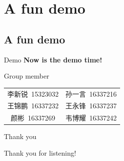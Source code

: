 \documentclass{beamer}
\begin{document}
\section{A fun demo}
\subsection{A fun demo}
\begin{frame}{Demo}
  \centering
  \Huge \textbf{\textcolor[rgb]{0,0,1}{Now is the demo time!}}
\end{frame}

\begin{frame}{Group member}
 \large
  \begin{center}
    \begin{tabular}{cc}%
    李新锐\ 15323032&孙一言\ 16337216\\
    王锦鹏\ 16337232&王永锋\ 16337237\\
    颜彬\ 16337269&韦博耀\ 16337242
    \end{tabular}
  \end{center}
\end{frame}

\begin{frame}{Thank you}
  \begin{center}
    \Huge Thank you for listening!
  \end{center}
\end{frame}
\end{document}

